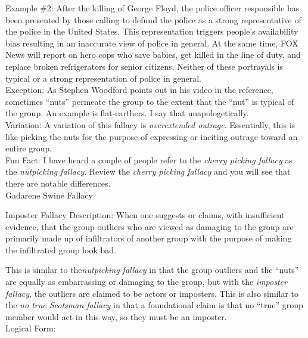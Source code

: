 \documentclass[a4paper,12pt,single,pdftex]{scrartcl}
\begin{document}
    
      Example \#2: After the killing of George Floyd, the police officer responsible has been presented by those calling to defund the police as a strong representative of the police in the United States. This representation triggers people’s availability bias resulting in an inaccurate view of police in general. At the same time, FOX News will report on hero cops who save babies, get killed in the line of duty, and replace broken refrigerators for senior citizens. Neither of these portrayals is typical or a strong representation of police in general.
    \\

    
      Exception: As Stephen Woodford points out in his video in the reference, sometimes “nuts” permeate the group to the extent that the “nut” is typical of the group. An example is flat-earthers. I say that unapologetically.
    \\

    
      Variation: A variation of this fallacy is {\it overextended outrage}. Essentially, this is like picking the nuts for the purpose of expressing or inciting outrage toward an entire group.
    \\

    
      Fun Fact: I have heard a couple of people refer to the {\em cherry picking fallacy} as the {\em nutpicking fallacy}. Review the {\em cherry picking fallacy} and you will see that there are notable differences.
    \\

  

Gadarene Swine Fallacy

Imposter Fallacy
    Description: When one suggests or claims, with insufficient evidence, that the group outliers who are viewed as damaging to the group are primarily made up of infiltrators of another group with the purpose of making the infiltrated group look bad.

    
      This is similar to the{\em  {\it nutpicking fallacy} }in that the group outliers and the “nuts” are equally as embarrassing or damaging to the group, but with the {\em imposter fallacy}, the outliers are claimed to be actors or imposters. This is also similar to the {\em no true Scotsman fallacy} in that a foundational claim is that no “true” group member would act in this way, so they must be an imposter.
    \\

    
      Logical Form:
    \\
\end{document}
